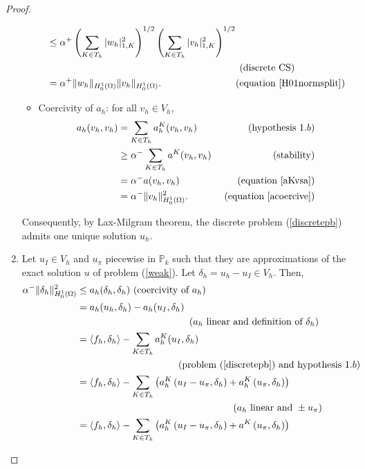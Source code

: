 \begin{proof}
\begin{enumerate}
\begin{itemize}
\begin{align*}
&\leq \alpha^+\left( \sum_{K\in T_h}|w_h|_{1,K}^2 \right)^{1/2}\left( \sum_{K\in T_h}|v_h|_{1,K}^2 \right)^{1/2} \\
&\hspace{6.9cm} \text{ (discrete CS)}\\
&= \alpha^+ \|w_h\|_{H_0^1(\Omega)}\|v_h\|_{H_0^1(\Omega)}. \hspace{2.6cm}\text{ (equation \ref{H01normsplit})}
\end{align*}
\item Coercivity of $a_h$: for all $v_h\in V_h$, 
\begin{align*}
a_h(v_h,v_h) &= \sum_{K\in T_h} a_h^K(v_h,v_h) &\text{ (hypothesis }1.b)\\
&\geq \alpha^-\sum_{K\in T_h} a^K(v_h,v_h) &\text{ (stability)}\\
&= \alpha^- a(v_h,v_h) &\text{ (equation \ref{aKvsa})}\\
&= \alpha^- \|v_h\|_{H_0^1(\Omega)}^2. &\text{ (equation \ref{acoercive})}
\end{align*}
\end{itemize}
Consequently, by Lax-Milgram theorem, the discrete problem (\ref{discretepb}) admits one unique solution $u_h$.
\item Let $u_I\in V_h$ and $u_\pi$ piecewise in $\mathbb{P}_k$ such that they are approximations of the exact solution $u$ of problem (\ref{weak}). Let $\delta_h = u_h-u_I\in V_h$. Then, 
\begin{align*}
\alpha^-\|\delta_h\|^2_{H_0^1(\Omega)}
&\leq a_h(\delta_h,\delta_h) \text{ (coercivity of }a_h)\\
&= a_h(u_h,\delta_h) - a_h(u_I,\delta_h) \\
& \hspace{4.1cm}(a_h \text{ linear and definition of }\delta_h)\\
&= \langle f_h, \delta_h\rangle - \sum_{K\in T_h}a_h^K(u_I,\delta_h) \\
& \hspace{3.7cm}\text{(problem (\ref{discretepb}) and hypothesis }1.b)\\
&= \langle f_h, \delta_h\rangle - \sum_{K\in T_h}\left( a_h^K\left( u_I-u_\pi, \delta_h \right) + a_h^K\left( u_\pi,\delta_h\right) \right)\\
&\hspace{5.7cm} (a_h \text{ linear and }\pm u_\pi)\\
&= \langle f_h, \delta_h\rangle - \sum_{K\in T_h}\left( a_h^K\left( u_I-u_\pi, \delta_h \right) + a^K\left( u_\pi,\delta_h\right) \right)\\

\end{align*}
\end{enumerate}
\end{proof}
